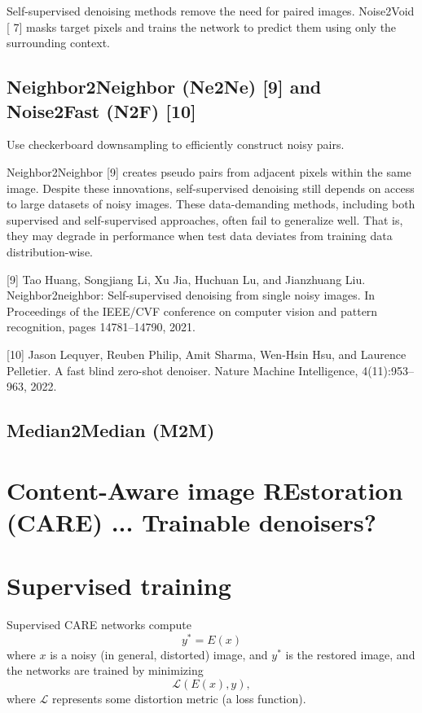 Self-supervised denoising methods remove the need for paired
images. Noise2Void [ 7] masks target pixels and trains the network to
predict them using only the surrounding context. %

\section{Neighbor2Neighbor (Ne2Ne) [9] and Noise2Fast (N2F) [10]}
Use checkerboard downsampling to efficiently construct noisy pairs.

Neighbor2Neighbor [9] creates pseudo pairs from adjacent pixels
within the same image. Despite these innovations, self-supervised
denoising still depends on access to large datasets of noisy
images. These data-demanding methods, including both supervised and
self-supervised approaches, often fail to generalize well. That is,
they may degrade in performance when test data deviates from training
data distribution-wise. %

[9] Tao Huang, Songjiang Li, Xu Jia, Huchuan Lu, and Jianzhuang Liu. Neighbor2neighbor: Self-supervised
denoising from single noisy images. In Proceedings of the IEEE/CVF conference on computer vision and pattern
recognition, pages 14781–14790, 2021.

[10] Jason Lequyer, Reuben Philip, Amit Sharma, Wen-Hsin Hsu, and Laurence Pelletier. A fast blind zero-shot
denoiser. Nature Machine Intelligence, 4(11):953–963, 2022.

\section{Median2Median (M2M)}

\chapter{Content-Aware image REstoration (CARE) ... Trainable denoisers?}



\chapter{Supervised training}

Supervised CARE networks compute
\begin{equation}
  y^* = E(x)
\end{equation}
where $x$ is a noisy (in general, distorted) image, and $y^*$ is the restored image, and the networks are trained by minimizing
\begin{equation}
  \mathcal{L}(E(x), y),
\end{equation}
where $\mathcal{L}$ represents some distortion metric (a loss
function). %

